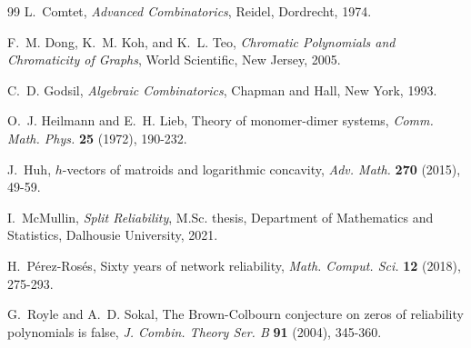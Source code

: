 \documentclass[12pt]{amsart}
\theoremstyle{definition}
\begin{document}
\begin{thebibliography}{99}
L.~Comtet,
\emph{Advanced Combinatorics},
Reidel, Dordrecht, 1974.

F.~M. Dong, K.~M. Koh, and K.~L. Teo,
\emph{Chromatic Polynomials and Chromaticity of Graphs},
World Scientific, New Jersey, 2005.

C.~D. Godsil,
\emph{Algebraic Combinatorics},
Chapman and Hall, New York, 1993.

O.~J. Heilmann and E.~H. Lieb,
Theory of monomer-dimer systems,
\emph{Comm. Math. Phys.} \textbf{25} (1972), 190-232.

J.~Huh,
$h$-vectors of matroids and logarithmic concavity,
\emph{Adv. Math.} \textbf{270} (2015), 49-59.

I.~McMullin,
\emph{Split Reliability},
M.Sc. thesis, Department of Mathematics and Statistics, Dalhousie University, 2021.

H.~P\'erez-Ros\'es,
Sixty years of network reliability,
\emph{Math. Comput. Sci.} \textbf{12} (2018), 275-293.

G.~Royle and A.~D. Sokal,
The Brown-Colbourn conjecture on zeros of reliability polynomials is false,
\emph{J. Combin. Theory Ser. B} \textbf{91} (2004), 345-360.

\end{thebibliography}
\end{document}
